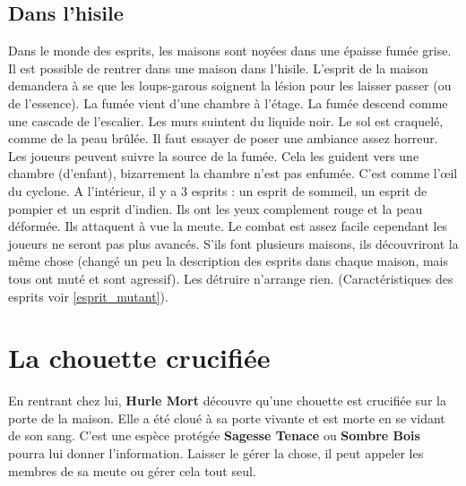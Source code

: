 \documentclass[oneside,12pt]{book}
\newcommand{\Jessica}{\textbf{Sagesse Tenace} }
\newcommand{\Peter}{\textbf{Hurle Mort} }
\newcommand{\Leonard}{\textbf{Sombre Bois} }
\begin{document}
\begin{flushleft}
\subsection{Dans l'hisile}
\label{hisile_enquete}
Dans le monde des esprits, les maisons sont noyées dans une épaisse fumée grise.
Il est possible de rentrer dans une maison dans l'hisile. 
L'esprit de la maison demandera à se que les loups-garous soignent la lésion pour les laisser passer (ou de l'essence). La fumée vient d'une chambre à l'étage. La fumée descend comme une cascade de l'escalier. Les murs suintent du liquide noir. Le sol est craquelé, comme de la peau brûlée. Il faut essayer de poser une ambiance assez horreur. Les joueurs peuvent suivre la source de la fumée. Cela les guident vers une chambre (d'enfant), bizarrement la chambre n'est pas enfumée. C'est comme l’œil du cyclone. A l'intérieur, il y a 3 esprits : un esprit de sommeil, un esprit de pompier et un esprit d'indien. Ils ont les yeux complement rouge et la peau déformée. Ils attaquent à vue la meute. Le combat est assez facile cependant les joueurs ne seront pas plus avancés. S'ils font plusieurs maisons, ils découvriront la même chose (changé un peu la description des esprits dans chaque maison, mais tous ont muté et sont agressif). Les détruire n'arrange rien.  (Caractéristiques des esprits voir \ref{esprit_mutant}). 

\section{La chouette crucifiée}
\label{chouette}
En rentrant chez lui, \Peter découvre qu'une chouette est crucifiée sur la porte de la maison. Elle a été cloué à sa porte vivante et est morte en se vidant de son sang. C'est une espèce protégée \Jessica ou \Leonard pourra lui donner l'information. Laisser le gérer la chose, il peut appeler les membres de sa meute ou gérer cela tout seul.


\end{flushleft}
\end{document}
